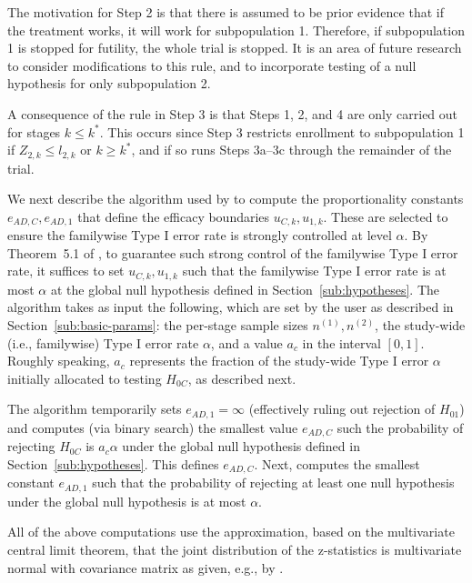 \documentclass[article]{jss}
\begin{document}
The motivation for Step 2 is that there is assumed to be prior evidence that if the treatment works, it will work for subpopulation 1. Therefore, if subpopulation 1 is stopped for futility, the whole trial is stopped. It is an area of future research to consider modifications to this rule, and to incorporate testing of a null hypothesis for only subpopulation 2.

A consequence of the rule in Step 3 is that Steps 1, 2, and 4 are only carried out for stages $k\leq k^*$.  This occurs since 
 Step 3 restricts enrollment to subpopulation 1 if $Z_{2,k} ≤ l_{2,k}$ or  $k\geq k^*$, and if so runs Steps 3a--3c through the remainder of the trial.

We next describe the algorithm used by   to compute the proportionality constants $e_{AD,C}, e_{AD,1}$ that define the efficacy boundaries $u_{C,k},u_{1,k}$. These are selected to ensure the familywise Type I error rate is strongly controlled at level $\alpha$. By Theorem~5.1 of  \citep{Rosenblum2013AdaptMISTIE}, to guarantee such strong control of the familywise Type I error rate, it suffices to set $u_{C,k},u_{1,k}$ such that the familywise Type I error rate is at most $\alpha$ at the global null hypothesis defined in Section~\ref{sub:hypotheses}.
The algorithm takes as input the following, which are set by the user as described in Section~\ref{sub:basic-params}: the per-stage sample sizes $n^{(1)},n^{(2)}$, the study-wide (i.e., familywise) Type I error rate $\alpha$, and a value $a_c$ in the interval $[0,1]$. 
Roughly speaking, $a_c$ represents the fraction of the study-wide Type I error $\alpha$ initially allocated to testing $H_{0C}$, as described next.

The algorithm temporarily sets $e_{AD,1}= \infty$ (effectively ruling out rejection of $H_{01}$)
and computes (via binary search) the smallest value $e_{AD,C}$ such the probability of rejecting $H_{0C}$ is $a_c α$ under the global null hypothesis defined in Section~\ref{sub:hypotheses}. This defines $e_{AD,C}$. 
Next,   computes the smallest constant $e_{AD,1}$ such that the probability of rejecting at least one null hypothesis under the global null hypothesis  is at most $\alpha$. %

All of the above computations use the approximation, based on the multivariate central limit theorem, that the joint distribution of the  z-statistics is multivariate normal  with covariance matrix as given, e.g., by \cite{JennisonTurnbullBook,Rosenblum2013AdaptMISTIE}.
\end{document}
